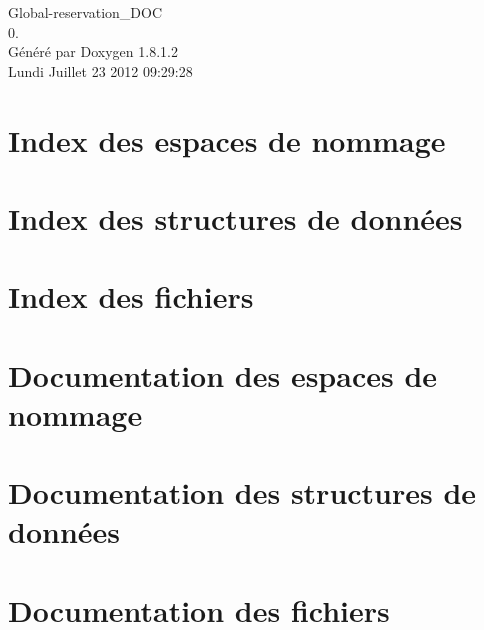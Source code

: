 \documentclass{book}
\begin{document}
\hypersetup{pageanchor=false,citecolor=blue}
\begin{titlepage}
\vspace*{7cm}
\begin{center}
{\Large Global-\/reservation\-\_\-\-D\-O\-C \\[1ex]\large 0. }\\
\vspace*{1cm}
{\large Généré par Doxygen 1.8.1.2}\\
\vspace*{0.5cm}
{\small Lundi Juillet 23 2012 09:29:28}\\
\end{center}
\end{titlepage}
\clearemptydoublepage
{}
\tableofcontents
\clearemptydoublepage
{}
\hypersetup{pageanchor=true,citecolor=blue}
\chapter{Index des espaces de nommage}

\chapter{Index des structures de données}

\chapter{Index des fichiers}

\chapter{Documentation des espaces de nommage}



\chapter{Documentation des structures de données}








\chapter{Documentation des fichiers}








\printindex
\end{document}
